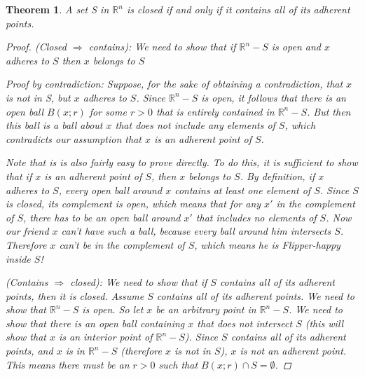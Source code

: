 \documentclass[11pt,a4paper]{report}
\theoremstyle{plain}
\newtheorem{thm}{Theorem}[section]
\theoremstyle{definition}
\theoremstyle{remark}
\begin{document}
   
\begin{thm}
A set S in $\mathbb{R}^n$ is closed if and only if it contains all of its adherent points. 
\begin{proof}
(Closed $\Rightarrow$ contains): We need to show that if $\mathbb{R}^n - S$ is open and $x$ adheres to $S$ then $x$ belongs to $S$

Proof by contradiction:
Suppose, for the sake of obtaining a contradiction, that $x$ is not in S, but $x$ adheres to $S$. Since $\mathbb{R}^n - S$ is open, it follows that there is an open ball $B(x; r)$ for some $r>0$ that is entirely contained in $\mathbb{R}^n - S$. But then this ball is a ball about $x$ that does not include any elements of $S$, which contradicts our assumption that $x$ is an adherent point of $S$.

Note that is is also fairly easy to prove directly.  To do this, it is sufficient to show that if $x$ is an adherent point of $S$, then $x$ belongs to $S$. By definition, if $x$ adheres to $S$, every open ball around $x$ contains at least one element of $S$. Since $S$ is closed, its complement is open, which means that for any $x'$ in the complement of $S$, there has to be an open ball around $x'$ that includes no elements of $S$.  Now our friend $x$ can't have such a ball, because every ball around him intersects $S$.  Therefore $x$ can't be in the complement of $S$, which means he is Flipper-happy inside $S$!

(Contains $\Rightarrow$ closed):
We need to show that if $S$ contains all of its adherent points, then it is closed.  Assume $S$ contains all of its adherent points.  We need to show that $\mathbb{R}^n - S$ is open. So let $x$ be an arbitrary point in $\mathbb{R}^n - S$.  We need to show that there is an open ball containing $x$ that does not intersect $S$ (this will show that $x$ is an interior point of $\mathbb{R}^n - S$).  Since $S$ contains all of its adherent points, and $x$ is in $\mathbb{R}^n - S$ (therefore $x$ is not in $S$), $x$ is not an adherent point.  This means there must be an $r>0$ such that $B(x;r) \cap S = \emptyset$. 
\end{proof}
\end{thm}
\end{document}
